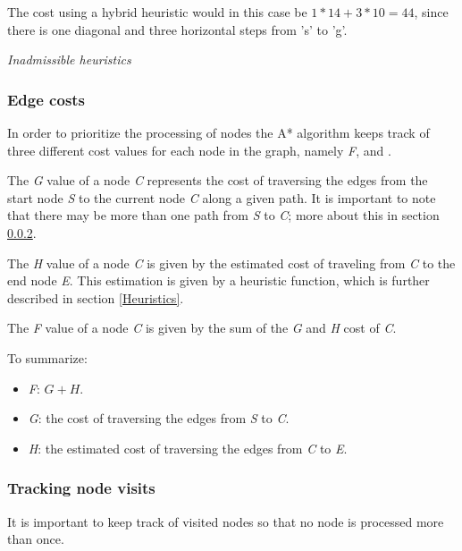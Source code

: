 \documentclass[12pt, a4paper]{article}
\begin{document}
The cost using a hybrid heuristic would in this case be $ 1*14 + 3*10 = 44 $,
since there is one diagonal and three horizontal steps from 's' to 'g'.

\textit{Inadmissible heuristics}


\subsubsection{Edge costs}
\label{Edge costs}

In order to prioritize the processing of nodes the A* algorithm keeps track of
three different cost values for each node in the graph, namely \textit{F},
 and .

The \textit{G} value of a node \textit{C} represents the cost of traversing the
edges from the start node \textit{S} to the current node \textit{C} along a
given path. It is important to note that there may be more than one path from
\textit{S} to \textit{C}; more about this in section \ref{Tracking node visits}.

The \textit{H} value of a node \textit{C} is given by the estimated cost of
traveling from \textit{C} to the end node \textit{E}. This estimation is given
by a heuristic function, which is further described in section \ref{Heuristics}.

The \textit{F} value of a node \textit{C} is given by the sum of the \textit{G}
and \textit{H} cost of \textit{C}.

To summarize:
\begin{itemize}
	\item \textit{F}: $ G + H $.
	\item \textit{G}: the cost of traversing the edges from \textit{S} to
	\textit{C}.
	\item \textit{H}: the estimated cost of traversing the edges from \textit{C}
	to \textit{E}.
\end{itemize}


\subsubsection{Tracking node visits}
\label{Tracking node visits}

It is important to keep track of visited nodes so that no node is processed more
than once.

\end{document}
